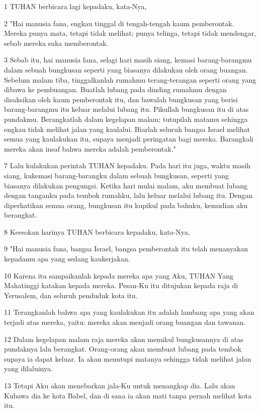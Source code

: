 \par 1 TUHAN berbicara lagi kepadaku, kata-Nya,
\par 2 "Hai manusia fana, engkau tinggal di tengah-tengah kaum pemberontak. Mereka punya mata, tetapi tidak melihat; punya telinga, tetapi tidak mendengar, sebab mereka suka memberontak.
\par 3 Sebab itu, hai manusia fana, selagi hari masih siang, kemasi barang-barangmu dalam sebuah bungkusan seperti yang biasanya dilakukan oleh orang buangan. Sebelum malam tiba, tinggalkanlah rumahmu terang-terangan seperti orang yang dibawa ke pembuangan. Buatlah lubang pada dinding rumahmu dengan disaksikan oleh kaum pemberontak itu, dan bawalah bungkusan yang berisi barang-barangmu itu keluar melalui lubang itu. Pikullah bungkusan itu di atas pundakmu. Berangkatlah dalam kegelapan malam; tutupilah matamu sehingga engkau tidak melihat jalan yang kaulalui. Biarlah seluruh bangsa Israel melihat semua yang kaulakukan itu, supaya menjadi peringatan bagi mereka. Barangkali mereka akan insaf bahwa mereka adalah pemberontak."
\par 7 Lalu kulakukan perintah TUHAN kepadaku. Pada hari itu juga, waktu masih siang, kukemasi barang-barangku dalam sebuah bungkusan, seperti yang biasanya dilakukan pengungsi. Ketika hari mulai malam, aku membuat lubang dengan tanganku pada tembok rumahku, lalu keluar melalui lubang itu. Dengan diperhatikan semua orang, bungkusan itu kupikul pada bahuku, kemudian aku berangkat.
\par 8 Keesokan harinya TUHAN berbicara kepadaku, kata-Nya,
\par 9 "Hai manusia fana, bangsa Israel, bangsa pemberontak itu telah menanyakan kepadamu apa yang sedang kaukerjakan.
\par 10 Karena itu sampaikanlah kepada mereka apa yang Aku, TUHAN Yang Mahatinggi katakan kepada mereka. Pesan-Ku itu ditujukan kepada raja di Yerusalem, dan seluruh penduduk kota itu.
\par 11 Terangkanlah bahwa apa yang kaulakukan itu adalah lambang apa yang akan terjadi atas mereka, yaitu: mereka akan menjadi orang buangan dan tawanan.
\par 12 Dalam kegelapan malam raja mereka akan memikul bungkusannya di atas pundaknya lalu berangkat. Orang-orang akan membuat lubang pada tembok supaya ia dapat keluar. Ia akan menutupi matanya sehingga tidak melihat jalan yang dilaluinya.
\par 13 Tetapi Aku akan menebarkan jala-Ku untuk menangkap dia. Lalu akan Kubawa dia ke kota Babel, dan di sana ia akan mati tanpa pernah melihat kota itu.
